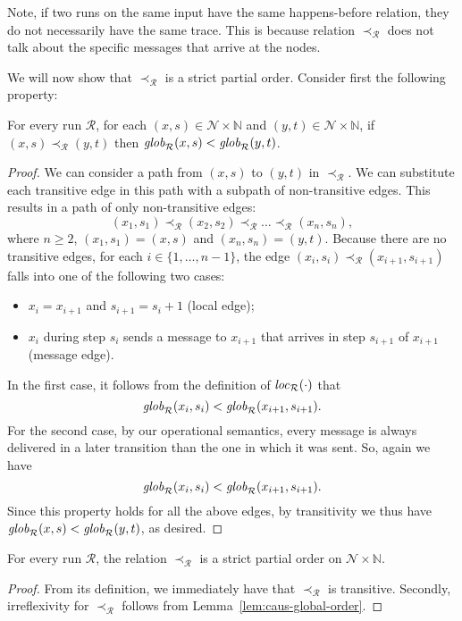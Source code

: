 \documentclass{tlp}
\newcommand{\Nat}{\mathbb{N}}  \newcommand{\len}[1]{|#1|} \newcommand{\rom}[1]{\text{\emph{(#1)}}} \newcommand{\romI}{\rom i}
\newcommand{\nw}{\mathcal{N}}
\newcommand{\run}{\mathcal{R}}
\newcommand{\locR}[1]{\fname{loc}_{\run}(#1)}
\newcommand{\globR}[1]{\fname{glob}_{\run}(#1)}
\newcommand{\nwnat}{\nw\times\Nat}
\newcommand{\caus}{\prec_{\run}}
\begin{document}
Note, if two runs on the same input have the same happens-before relation,
they do not necessarily have the same trace. This is because relation
$\caus$ does not talk about the specific messages that arrive at
the nodes.



We will now show that $\caus$ is a strict partial order. Consider
first the following property:

\begin{lemma}\label{lem:caus-global-order}For every run $\run$,
for each $(x,s)\in\nwnat$ and $(y,t)\in\nwnat$, if $(x,s)\caus(y,t)$
then $\globR{x,s}<\globR{y,t}$.\end{lemma}

\begin{proof}We can consider a path from $(x,s)$ to $(y,t)$ in
$\caus$. We can substitute each transitive edge in this path with
a subpath of non-transitive edges. This results in a path of only
non-transitive edges: 
\[
(x_{1},s_{1})\caus(x_{2},s_{2})\caus\ldots\caus(x_{n},s_{n}),
\]
where $n\geq2$, $(x_{1},s_{1})=(x,s)$ and $(x_{n},s_{n})=(y,t)$.
Because there are no transitive edges, for each $i\in\{1,\ldots,n-1\}$,
the edge $(x_{i},s_{i})\caus(x_{i+1},s_{i+1})$ falls into one of
the following two cases:
\begin{itemize}
\item $x_{i}=x_{i+1}$ and $s_{i+1}=s_{i}+1$ (local edge);
\item $x_{i}$ during step $s_{i}$ sends a message to $x_{i+1}$ that arrives
in step $s_{i+1}$ of $x_{i+1}$ (message edge).
\end{itemize}
In the first case, it follows from the definition of $\locR{\cdot}$
that 
\[
\globR{x_{i},s_{i}}<\globR{x_{i+1},s_{i+1}}.
\]
For the second case, by our operational semantics, every message is
always delivered in a later transition than the one in which it was
sent. So, again we have 
\[
\globR{x_{i},s_{i}}<\globR{x_{i+1},s_{i+1}}.
\]
Since this property holds for all the above edges, by transitivity
we thus have $\globR{x,s}<\globR{y,t}$, as desired.\end{proof}



\begin{corollary}For every run $\run$, the relation $\caus$ is
a strict partial order on $\nwnat$.\end{corollary}

\begin{proof}From its definition, we immediately have that $\caus$
is transitive. Secondly, irreflexivity for $\caus$ follows from Lemma~\ref{lem:caus-global-order}.\end{proof}
\end{document}
